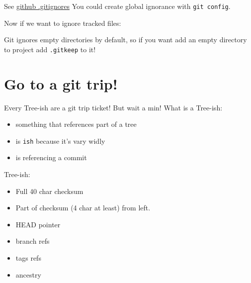 \documentclass[a4paper,10pt]{article}
\newenvironment{Shaded}{}{}
\newcommand{\KeywordTok}[1]{\textcolor[rgb]{0.00,0.44,0.13}{\textbf{{#1}}}}
\newcommand{\StringTok}[1]{\textcolor[rgb]{0.25,0.44,0.63}{{#1}}}
\newcommand{\NormalTok}[1]{{#1}}
\begin{document}
See \href{https://github.com/github/gitignore}{github .gitignores} You
could create global ignorance with \texttt{git config}.

Now if we want to ignore tracked files:

\begin{Shaded}
\end{Shaded}

Git ignores empty directories by default, so if you want add an empty
directory to project add \texttt{.gitkeep} to it!

\section{Go to a git trip!}\label{go-to-a-git-trip}

Every Tree-ish are a git trip ticket! But wait a min! What is a
Tree-ish:

\begin{itemize}
\itemsep1pt\parskip0pt
\item
  something that references part of a tree
\item
  is \texttt{ish} because it's vary widly
\item
  is referencing a commit
\end{itemize}

Tree-ish:

\begin{itemize}
\itemsep1pt\parskip0pt
\item
  Full 40 char checksum
\item
  Part of checksum (4 char at least) from left.
\item
  HEAD pointer
\item
  branch refs
\item
  tags refs
\item
  ancestry
\end{itemize}
\end{document}
